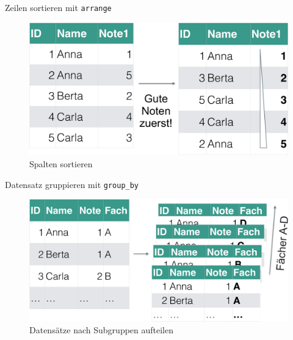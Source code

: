 \begin{frame}{Zeilen sortieren mit \texttt{arrange}}

\begin{figure}

{\centering \includegraphics[width=0.8\linewidth]{../images/Datenjudo/arrange-crop} 

}

\caption{Spalten sortieren}\label{fig:fig-arrange}
\end{figure}

\end{frame}

\begin{frame}{Datensatz gruppieren mit \texttt{group\_by}}

\begin{figure}

{\centering \includegraphics[width=0.8\linewidth]{../images/Datenjudo/group_by} 

}

\caption{Datensätze nach Subgruppen aufteilen}\label{fig:fig-groupby}
\end{figure}

\end{frame}

